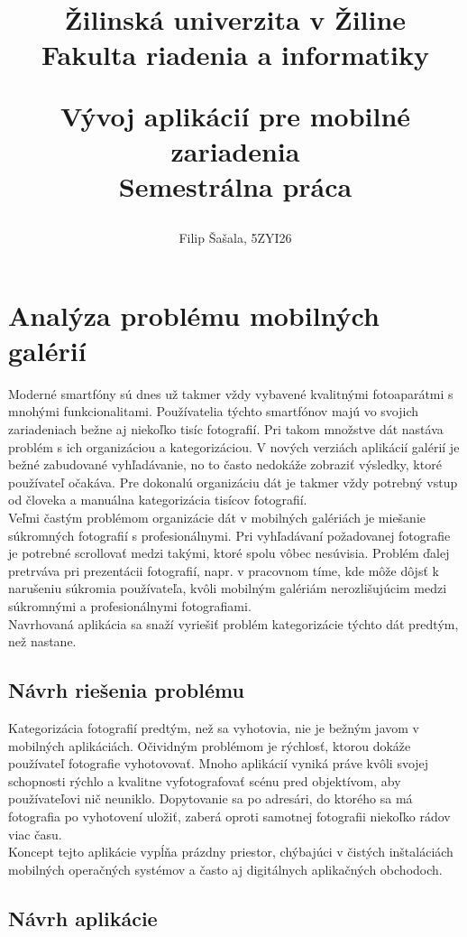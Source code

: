 \documentclass[11pt]{article} %
\title{
	\large {
		Žilinská univerzita v Žiline\\Fakulta riadenia a informatiky\\
	}
	
	\vspace{2cm}
	
	\huge {
		Vývoj aplikácií pre mobilné zariadenia\\
		Semestrálna práca
	}
	
	\vspace{11cm}
}
\author{
	Filip Šašala, 5ZYI26
}
\date{} %
\begin{document}
\maketitle
\pagebreak

\section{Analýza problému mobilných galérií}
Moderné smartfóny sú dnes už takmer vždy vybavené kvalitnými fotoaparátmi s mnohými funkcionalitami. Používatelia týchto smartfónov majú vo svojich zariadeniach bežne aj niekoľko tisíc fotografií. Pri takom množstve dát nastáva problém s ich organizáciou a kategorizáciou. V nových verziách aplikácií galérií je bežné zabudované vyhľadávanie, no to často nedokáže zobraziť výsledky, ktoré používateľ očakáva. Pre dokonalú organizáciu dát je takmer vždy potrebný vstup od človeka a manuálna kategorizácia tisícov fotografií.\\
Veľmi častým problémom organizácie dát v mobilných galériách je miešanie súkromných fotografií s profesionálnymi. Pri vyhľadávaní požadovanej fotografie je potrebné scrollovať medzi takými, ktoré spolu vôbec nesúvisia. Problém ďalej pretrváva pri prezentácii fotografií, napr. v pracovnom tíme, kde môže dôjsť k narušeniu súkromia používateľa, kvôli mobilným galériám nerozlišujúcim medzi súkromnými a profesionálnymi fotografiami.\\
Navrhovaná aplikácia sa snaží vyriešiť problém kategorizácie týchto dát predtým, než nastane.\\

\subsection{Návrh riešenia problému}
Kategorizácia fotografií predtým, než sa vyhotovia, nie je bežným javom v mobilných aplikáciách. Očividným problémom je rýchlosť, ktorou dokáže používateľ fotografie vyhotovovať. Mnoho aplikácií vyniká práve kvôli svojej schopnosti rýchlo a kvalitne vyfotografovať scénu pred objektívom, aby používateľovi nič neuniklo. Dopytovanie sa po adresári, do ktorého sa má fotografia po vyhotovení uložiť, zaberá oproti samotnej fotografii niekoľko rádov viac času.\\
Koncept tejto aplikácie vypĺňa prázdny priestor, chýbajúci v čistých inštaláciách mobilných operačných systémov a často aj digitálnych aplikačných obchodoch.\\

\subsection{Návrh aplikácie}
\end{document}
